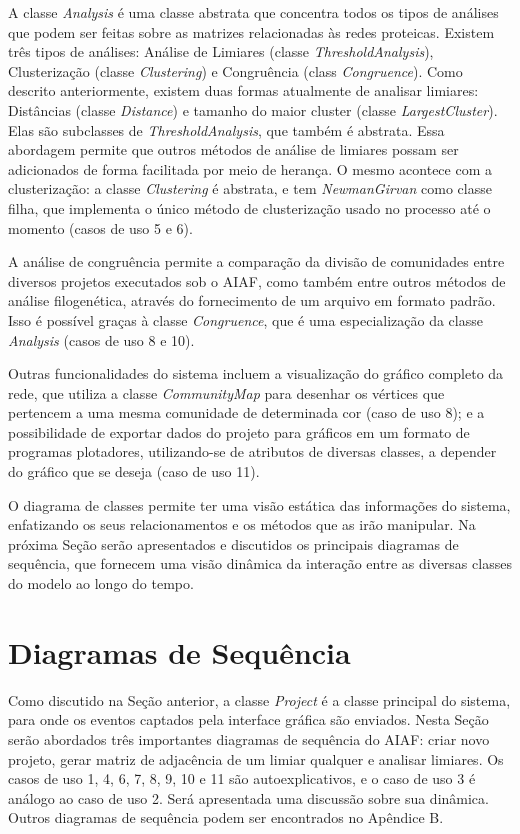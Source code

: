 A classe \textit{Analysis} é uma classe abstrata que concentra todos os tipos de análises que podem ser feitas sobre as matrizes relacionadas às redes
proteicas. Existem três tipos de análises: Análise de Limiares (classe \textit{ThresholdAnalysis}), Clusterização (classe \textit{Clustering}) e
Congruência (class \textit{Congruence}). Como descrito anteriormente, existem duas formas atualmente de analisar limiares: Distâncias (classe
\textit{Distance}) e tamanho do maior cluster (classe \textit{LargestCluster}). Elas são subclasses de \textit{ThresholdAnalysis}, que também é abstrata. Essa
abordagem permite que outros métodos de análise de limiares possam ser adicionados de forma facilitada por meio de herança. O mesmo acontece com a
clusterização: a classe \textit{Clustering} é abstrata, e tem \textit{NewmanGirvan} como classe filha, que implementa o único método de clusterização
usado no processo até o momento (casos de uso 5 e 6).

A análise de congruência permite a comparação da divisão de comunidades entre diversos projetos executados sob o AIAF, como também entre outros métodos de
análise filogenética, através do fornecimento de um arquivo em formato padrão. Isso é possível graças à classe \textit{Congruence}, que é uma
especialização da classe
\textit{Analysis} (casos de uso 8 e 10).

Outras funcionalidades do sistema incluem a visualização do gráfico completo da rede, que utiliza a classe \textit{CommunityMap} para desenhar
os vértices que pertencem a uma mesma comunidade de determinada cor (caso de uso 8); e a possibilidade de exportar dados do projeto para
gráficos em um formato de programas plotadores, utilizando-se de atributos de diversas classes, a depender do gráfico que se deseja (caso de uso 11).

O diagrama de classes permite ter uma visão estática das informações do sistema, enfatizando os seus relacionamentos e os métodos que as irão manipular.
Na próxima Seção serão apresentados e discutidos os principais diagramas de sequência, que fornecem uma visão dinâmica da interação entre as diversas
classes do modelo ao longo do tempo.

\section{Diagramas de Sequência} \label{sec:dinamica}

Como discutido na Seção anterior, a classe \textit{Project} é a classe principal do sistema, para onde os eventos captados pela interface gráfica são
enviados. Nesta Seção serão abordados três importantes diagramas de sequência do AIAF: criar novo projeto, gerar matriz de adjacência de um limiar qualquer
e analisar limiares. Os casos de uso 1, 4, 6, 7, 8, 9, 10 e 11 são autoexplicativos, e o caso de uso 3 é análogo ao caso de uso 2. Será
apresentada uma discussão sobre sua dinâmica. Outros diagramas de sequência podem ser encontrados no Apêndice B.

